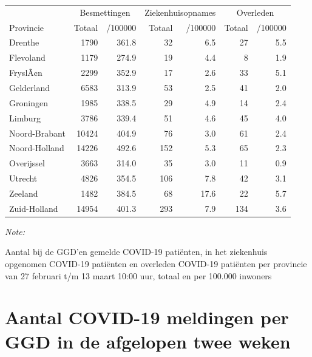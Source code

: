 \documentclass[
  english,
  man,floatsintext]{apa6}
\begin{document}
\begin{table}
\centering
\begin{threeparttable}
\begin{tabular}{lrrrrrr}
\toprule
\multicolumn{1}{c}{ } & \multicolumn{2}{c}{Besmettingen} & \multicolumn{2}{c}{Ziekenhuisopnames} & \multicolumn{2}{c}{Overleden} \\
\cmidrule(l{3pt}r{3pt}){2-3} \cmidrule(l{3pt}r{3pt}){4-5} \cmidrule(l{3pt}r{3pt}){6-7}
Provincie & Totaal & /100000 & Totaal & /100000 & Totaal & /100000\\
\midrule
Drenthe & 1790 & 361.8 & 32 & 6.5 & 27 & 5.5\\
Flevoland & 1179 & 274.9 & 19 & 4.4 & 8 & 1.9\\
FryslÃ¢n & 2299 & 352.9 & 17 & 2.6 & 33 & 5.1\\
Gelderland & 6583 & 313.9 & 53 & 2.5 & 41 & 2.0\\
Groningen & 1985 & 338.5 & 29 & 4.9 & 14 & 2.4\\
Limburg & 3786 & 339.4 & 51 & 4.6 & 45 & 4.0\\
Noord-Brabant & 10424 & 404.9 & 76 & 3.0 & 61 & 2.4\\
Noord-Holland & 14226 & 492.6 & 152 & 5.3 & 65 & 2.3\\
Overijssel & 3663 & 314.0 & 35 & 3.0 & 11 & 0.9\\
Utrecht & 4826 & 354.5 & 106 & 7.8 & 42 & 3.1\\
Zeeland & 1482 & 384.5 & 68 & 17.6 & 22 & 5.7\\
Zuid-Holland & 14954 & 401.3 & 293 & 7.9 & 134 & 3.6\\
\bottomrule
\end{tabular}
\begin{tablenotes}
\item \textit{Note: } 
\item Aantal bij de GGD’en gemelde COVID-19 patiënten, in het ziekenhuis opgenomen COVID-19 patiënten en overleden COVID-19 patiënten per provincie van 27 februari t/m 13 maart 10:00 uur, totaal en per 100.000 inwoners
\end{tablenotes}
\end{threeparttable}
\end{table}

\newpage

\hypertarget{aantal-covid-19-meldingen-per-ggd-in-de-afgelopen-twee-weken}{%
\section{Aantal COVID-19 meldingen per GGD in de afgelopen twee weken}\label{aantal-covid-19-meldingen-per-ggd-in-de-afgelopen-twee-weken}}
\end{document}

